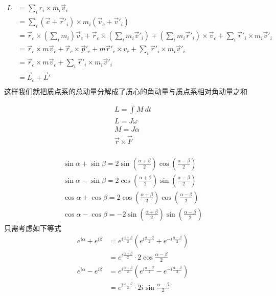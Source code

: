 \begin{thm}[质点系角动量的分解]
\begin{align*}
		L &= \sum_{i}^{} r_i \times m_i\vec v_i\\
		&= \sum_{i}^{}(\vec c+ \vec r'_i)\times m_i(\vec v_c+\vec v'_i) \\
		&= \vec r_c\times (\sum_i m_i)\vec v_c+ \vec r_c\times (\sum_im_i\vec v'_i)+(\sum_im_i\vec r'_i)\times \vec v_c+\sum_i\vec r'_i\times m_i\vec v'_i\\
		&= \vec r_c\times m\vec v_c+\vec r_c\times \vec p'_c+m\vec r'_c\times v_c+\sum_i\vec r'_i\times m_i\vec v'_i \\
		&= \vec r_c\times m\vec v_c + \sum_i\vec r'_i\times m_i\vec v'_i \\
		&= \vec L_c + \vec L' \\
\end{align*}
这样我们就把质点系的总动量分解成了质心的角动量与质点系相对角动量之和
\end{thm}
\begin{thm}
\begin{align*}
		L = \int_{{}}^{{}} {M} \: d{t} {}\\
		L = J\omega \\
		M = J \alpha \\
		\vec r\times \vec F\\
\end{align*}
\end{thm}
\begin{thm}
\begin{align*}
		\sin  \alpha+\sin \beta = 2\sin \left( \frac{\alpha+\beta}{2}  \right) \cos \left( \frac{\alpha-\beta}{2}  \right) \\
		\sin  \alpha-\sin \beta = 2\cos \left( \frac{\alpha+\beta}{2}  \right) \sin \left( \frac{\alpha-\beta}{2}  \right) \\
		\cos  \alpha+\cos \beta = 2\cos \left( \frac{\alpha+\beta}{2}  \right) \cos \left( \frac{\alpha-\beta}{2}  \right) \\
		\cos  \alpha-\cos \beta =- 2\sin \left( \frac{\alpha+\beta}{2}  \right) \sin \left( \frac{\alpha-\beta}{2}  \right) 
\end{align*}
只需考虑如下等式
\begin{align*}
		e^{i\alpha}+e^{i\beta}&=e^{i\frac{ \alpha+\beta }{2} }\left( e^{i\frac{\alpha-\beta}{2}} + e^{-i \frac{\alpha-\beta}{2} }\right) 	\\
							  &= e^{i\frac{\alpha+\beta}{2}} \cdot 2\cos \frac{\alpha-\beta}{2} \\
		e^{i\alpha}-e^{i\beta}&=e^{i\frac{ \alpha+\beta }{2} }\left( e^{i\frac{\alpha-\beta}{2}} - e^{-i \frac{\alpha-\beta}{2} }\right) 	\\
							  &= e^{i\frac{\alpha+\beta}{2}} \cdot 2i\sin \frac{\alpha-\beta}{2} 
\end{align*}
\end{thm}
